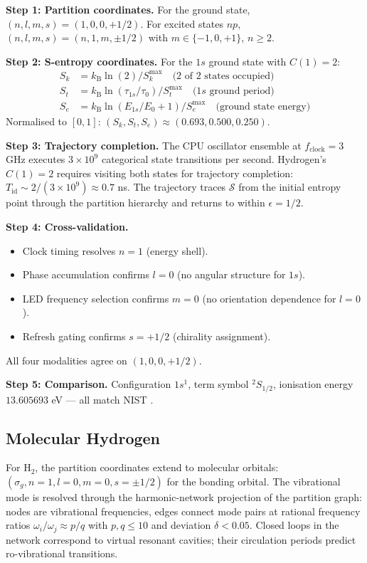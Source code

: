 \documentclass[11pt,a4paper]{article}
\theoremstyle{stmtstyle}
\theoremstyle{definition}
\theoremstyle{remark}
\newcommand{\kB}{k_{\mathrm{B}}}
\newcommand{\Sk}{S_{k}}
\newcommand{\St}{S_{t}}
\newcommand{\Se}{S_{e}}
\newcommand{\Sspace}{\mathcal{S}}
\begin{document}
\textbf{Step 1: Partition coordinates.} For the ground state, $(n, l, m, s) = (1, 0, 0, +1/2)$. For excited states $np$, $(n, l, m, s) = (n, 1, m, \pm 1/2)$ with $m \in \{-1, 0, +1\}$, $n \geq 2$.

\textbf{Step 2: S-entropy coordinates.} For the $1s$ ground state with $C(1) = 2$:
\begin{align}
\Sk &= \kB \ln(2) / \Sk^{\max} \quad \text{(2 of 2 states occupied)} \\
\St &= \kB \ln(\tau_{1s}/\tau_{0}) / \St^{\max} \quad \text{($1s$ ground period)} \\
\Se &= \kB \ln(E_{1s}/E_{0} + 1) / \Se^{\max} \quad \text{(ground state energy)}
\end{align}
Normalised to $[0,1]$: $(\Sk, \St, \Se) \approx (0.693, 0.500, 0.250)$.

\textbf{Step 3: Trajectory completion.} The CPU oscillator ensemble at $f_{\mathrm{clock}} = 3$ GHz executes $3 \times 10^{9}$ categorical state transitions per second. Hydrogen's $C(1) = 2$ requires visiting both states for trajectory completion: $T_{\mathrm{id}} \sim 2/(3\times 10^{9}) \approx 0.7$ ns. The trajectory traces $\Sspace$ from the initial entropy point through the partition hierarchy and returns to within $\epsilon = 1/2$.

\textbf{Step 4: Cross-validation.}
\begin{itemize}[nosep]
\item Clock timing resolves $n = 1$ (energy shell).
\item Phase accumulation confirms $l = 0$ (no angular structure for $1s$).
\item LED frequency selection confirms $m = 0$ (no orientation dependence for $l=0$).
\item Refresh gating confirms $s = +1/2$ (chirality assignment).
\end{itemize}
All four modalities agree on $(1, 0, 0, +1/2)$.

\textbf{Step 5: Comparison.} Configuration $1s^{1}$, term symbol $^{2}S_{1/2}$, ionisation energy $13.605693$ eV --- all match NIST \citep{nistasd2023}.

\subsection{Molecular Hydrogen}
\label{sec:methods_h2}

For H$_{2}$, the partition coordinates extend to molecular orbitals: $(\sigma_{g}, n=1, l=0, m=0, s=\pm 1/2)$ for the bonding orbital. The vibrational mode is resolved through the harmonic-network projection of the partition graph: nodes are vibrational frequencies, edges connect mode pairs at rational frequency ratios $\omega_{i}/\omega_{j} \approx p/q$ with $p, q \leq 10$ and deviation $\delta < 0.05$. Closed loops in the network correspond to virtual resonant cavities; their circulation periods predict ro-vibrational transitions.
\end{document}
